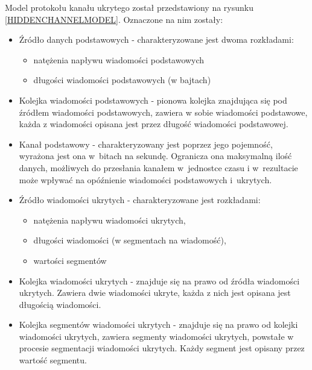 \documentclass[a4paper, twoside, openright, 12pt]{report}
\begin{document}
    Model protokołu kanału ukrytego został przedstawiony na rysunku \ref{HIDDENCHANNELMODEL}.
    Oznaczone na nim zostały:
    \begin{itemize}
        \item Źródło danych podstawowych - charakteryzowane jest dwoma rozkładami:
            \begin{itemize}
                \item natężenia napływu wiadomości podstawowych
                \item długości wiadomości podstawowych (w bajtach)
            \end{itemize}
        \item Kolejka wiadomości podstawowych - pionowa kolejka znajdująca się pod
    źródłem wiadomości podstawowych, zawiera w sobie wiadomości podstawowe,
    każda z wiadomości opisana jest przez długość wiadomości podstawowej.
        \item Kanał podstawowy - charakteryzowany jest
    poprzez jego pojemność, wyrażona jest ona w~bitach na sekundę. Ogranicza ona
    maksymalną ilość danych, możliwych do przesłania kanałem w~jednostce czasu i
    w~rezultacie może wpływać na opóźnienie wiadomości podstawowych i~ukrytych.
        \item Źródło wiadomości ukrytych - charakteryzowane jest rozkładami:
            \begin{itemize}
                \item natężenia napływu wiadomości ukrytych,
                \item długości wiadomości (w segmentach na wiadomość),
                \item wartości segmentów
            \end{itemize}
        \item Kolejka wiadomości ukrytych - znajduje się na prawo od źródła wiadomości ukrytych.
            Zawiera dwie wiadomości ukryte, każda z nich jest opisana jest długością wiadomości.
        \item Kolejka segmentów wiadomości ukrytych - znajduje się na prawo od kolejki
            wiadomości ukrytych, zawiera segmenty wiadomości ukrytych, powstałe w procesie
            segmentacji wiadomości ukrytych. Każdy segment jest opisany przez wartość segmentu.
    \end{itemize}
\end{document}
